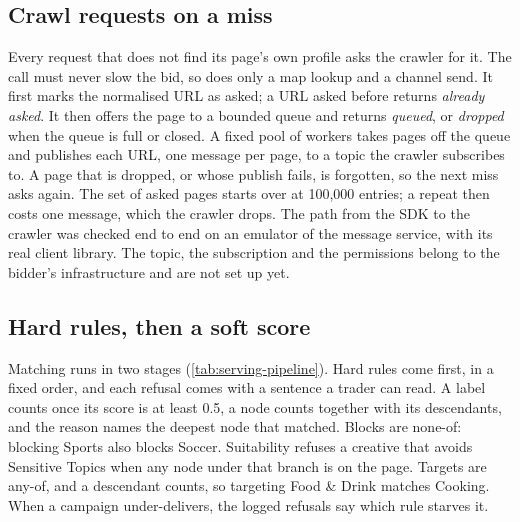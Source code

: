 \subsection{Crawl requests on a miss}\label{sec:serving-crawl}

Every request that does not find its page's own profile asks the crawler for
it. The call must never slow the bid, so  does only
a map lookup and a channel send. It first marks the normalised URL as asked;
a URL asked before returns \emph{already asked}. It then offers the page to a
bounded queue and returns \emph{queued}, or \emph{dropped} when the queue is
full or closed. A fixed pool of workers takes pages off the queue and
publishes each URL, one message per page, to a topic the crawler subscribes
to. A page that is dropped, or whose publish fails, is forgotten, so the next
miss asks again. The set of asked pages starts over at 100,000 entries; a
repeat then costs one message, which the crawler drops. The path from the SDK to the crawler was checked end to
end on an emulator of the message service, with its real client library. The
topic, the subscription and the permissions belong
to the bidder's infrastructure and are not set up yet.

\subsection{Hard rules, then a soft score}\label{sec:serving-rules}

Matching runs in two stages (\cref{tab:serving-pipeline}). Hard rules come
first, in a fixed order, and each refusal comes with a sentence a trader can
read. A label counts once its score is at least 0.5, a node counts together
with its descendants, and the reason names the deepest node that matched.
Blocks are none-of: blocking Sports also blocks Soccer. Suitability refuses a
creative that avoids Sensitive Topics when any node under that branch is on
the page. Targets are any-of, and a descendant counts, so targeting Food \&
Drink matches Cooking. When a campaign under-delivers, the
logged refusals say which rule starves it.

